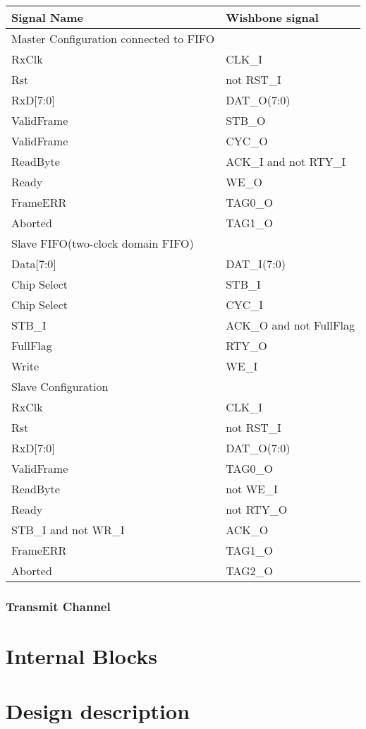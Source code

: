 \documentclass[a4paper,11pt]{article}
\begin{document}
\begin{tabular}{|l|l|}
\hline
Signal Name& Wishbone signal\\
\hline
\hline
Master Configuration connected to FIFO&\\
\hline
RxClk & CLK\_I\\
Rst & not RST\_I\\
RxD[7:0]& DAT\_O(7:0)\\
ValidFrame& STB\_O\\
ValidFrame& CYC\_O\\
ReadByte& ACK\_I and not RTY\_I\\
Ready& WE\_O\\
FrameERR& TAG0\_O\\
Aborted& TAG1\_O\\
\hline
Slave FIFO(two-clock domain FIFO)&\\
\hline
Data[7:0]& DAT\_I(7:0)\\
Chip Select& STB\_I\\
Chip Select& CYC\_I\\
STB\_I& ACK\_O and not FullFlag\\
FullFlag& RTY\_O\\
Write& WE\_I\\
\hline
Slave Configuration &\\
\hline
RxClk & CLK\_I\\
Rst & not RST\_I\\
RxD[7:0]& DAT\_O(7:0)\\
ValidFrame& TAG0\_O\\
ReadByte& not WE\_I\\
Ready& not RTY\_O\\
STB\_I and not WR\_I& ACK\_O\\
FrameERR& TAG1\_O\\
Aborted& TAG2\_O\\
\hline
\end{tabular}


\subsubsection{Transmit Channel}


\section{Internal Blocks}


\section{Design description}
\end{document}
